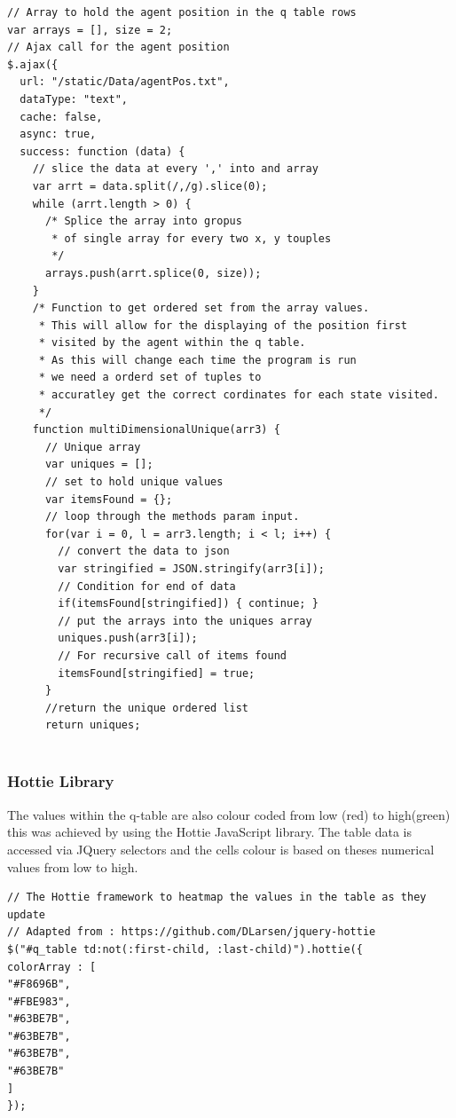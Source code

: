 \begin{verbatim}
// Array to hold the agent position in the q table rows
var arrays = [], size = 2;
// Ajax call for the agent position 
$.ajax({
  url: "/static/Data/agentPos.txt",
  dataType: "text",
  cache: false,
  async: true,
  success: function (data) {
    // slice the data at every ',' into and array 
    var arrt = data.split(/,/g).slice(0);
    while (arrt.length > 0) {
      /* Splice the array into gropus
       * of single array for every two x, y touples 
       */
      arrays.push(arrt.splice(0, size));
    }
    /* Function to get ordered set from the array values.
     * This will allow for the displaying of the position first
     * visited by the agent within the q table.
     * As this will change each time the program is run
     * we need a orderd set of tuples to
     * accuratley get the correct cordinates for each state visited.
     */
    function multiDimensionalUnique(arr3) {
      // Unique array
      var uniques = [];
      // set to hold unique values
      var itemsFound = {};
      // loop through the methods param input.
      for(var i = 0, l = arr3.length; i < l; i++) {
        // convert the data to json
        var stringified = JSON.stringify(arr3[i]);
        // Condition for end of data
        if(itemsFound[stringified]) { continue; }
        // put the arrays into the uniques array
        uniques.push(arr3[i]);
        // For recursive call of items found
        itemsFound[stringified] = true;
      }
      //return the unique ordered list 
      return uniques;


\end{verbatim}

\subsubsection{Hottie Library}
The values within the q-table are also colour coded from low (red) to high(green) this was achieved by using the Hottie JavaScript library. The table data is accessed via JQuery selectors and the cells colour is based on theses numerical values from low to high.
\begin{verbatim}
// The Hottie framework to heatmap the values in the table as they update
// Adapted from : https://github.com/DLarsen/jquery-hottie
$("#q_table td:not(:first-child, :last-child)").hottie({
colorArray : [
"#F8696B",
"#FBE983",
"#63BE7B",
"#63BE7B",
"#63BE7B",
"#63BE7B"
]
});
\end{verbatim}
